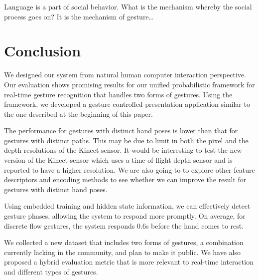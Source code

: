 \begin{savequote}
Language is a part of social behavior. What is the mechanism whereby the social
process goes on? It is the mechanism of gesture\ldots
{}
\end{savequote}
\chapter{Conclusion}
We designed our system from natural human computer interaction perspective.
Our evaluation shows promising results for our unified probabilistic framework
for real-time gesture recognition that handles two forms of gestures. Using the
framework, we developed a gesture controlled presentation application similar to
the one described at the beginning of this paper.

The performance for gestures with distinct hand poses is lower than that for
gestures with distinct paths. This may be due to limit in
both the pixel and the depth resolutions of the Kinect sensor. It would be interesting to test
the new version of the Kinect sensor which uses a time-of-flight depth sensor
and is reported to have a higher resolution. We are also going to to explore
other feature descriptors and encoding methods to see whether we can
improve the result for gestures with distinct hand poses.

Using embedded training and hidden state information, we can effectively
detect gesture phases, allowing the system to respond more promptly. On average,
for discrete flow gestures, the system responds 0.6s before the hand comes to
rest. 

We collected a new dataset that includes two forms of gestures, a
combination currently lacking in the community, and plan to make it
public. We have also proposed a hybrid evaluation metric
that is more relevant to real-time interaction and different types of gestures.